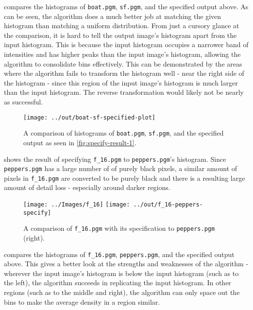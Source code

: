 \documentclass[headings=optiontoheadandtoc,listof=totoc,parskip=full]{scrartcl}
\begin{document}
 compares the histograms of \texttt{boat.pgm}, \texttt{sf.pgm}, and the specified output above. As can be seen, the algorithm does a much better job at matching the given histogram than matching a uniform distribution. From just a cursory glance at the comparison, it is hard to tell the output image's histogram apart from the input histogram. This is because the input histogram occupies a narrower band of intensities and has higher peaks than the input image's histogram, allowing the algorithm to consolidate bins effectively. This can be demonstrated by the areas where the algorithm fails to transform the histogram well - near the right side of the histogram - since this region of the input image's histogram is much larger than the input histogram. The reverse transformation would likely not be nearly as successful.

\begin{figure}[H]
	\centering\texttt{[image: ../out/boat-sf-specified-plot]}
	\caption{A comparison of histograms of \texttt{boat.pgm}, \texttt{sf.pgm}, and the specified output as seen in \cref{fig:specify-result-1}.}
	\label{fig:specify-histogram-1}
\end{figure}

 shows the result of specifying \texttt{f\_16.pgm} to \texttt{peppers.pgm}'s histogram. Since \texttt{peppers.pgm} has a large number of of purely black pixels, a similar amount of pixels in \texttt{f\_16.pgm} are converted to be purely black and there is a resulting large amount of detail loss - especially around darker regions.

\begin{figure}[H]
	\centering
	\texttt{[image: ../Images/f\_16]}
	\texttt{[image: ../out/f\_16-peppers-specify]}
	\caption{A comparison of \texttt{f\_16.pgm} with its specification to \texttt{peppers.pgm} (right).}
	\label{fig:specify-result-2}
\end{figure}

 compares the histograms of \texttt{f\_16.pgm}, \texttt{peppers.pgm}, and the specified output above. This gives a better look at the strengths and weaknesses of the algorithm - wherever the input image's histogram is below the input histogram (such as to the left), the algorithm succeeds in replicating the input histogram. In other regions (such as to the middle and right), the algorithm can only space out the bins to make the average density in a region similar.
\end{document}

